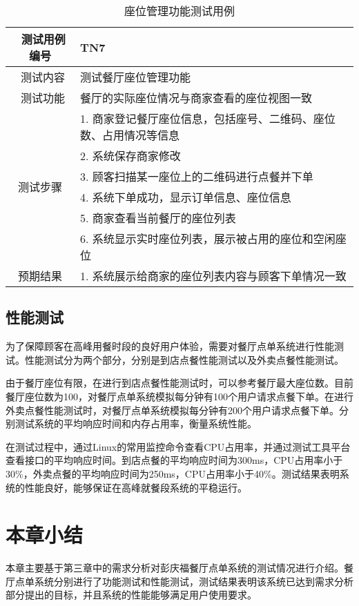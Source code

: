 \begin{table}[htbp!]
    \footnotesize
    \centering
    \caption{座位管理功能测试用例}
    \vspace{2mm}
    \begin{tabular}{cp{11.5cm}}
     \hline
     \ 测试用例编号 & TN7 \\ 
     \hline
     \ 测试内容 & 测试餐厅座位管理功能\\ 
     \hline
     \ 测试功能 & 餐厅的实际座位情况与商家查看的座位视图一致 \\ 
     \hline
     \multirow{6}{*}{测试步骤}
      & 1. 商家登记餐厅座位信息，包括座号、二维码、座位数、占用情况等信息\\
      & 2. 系统保存商家修改\\
      & 3. 顾客扫描某一座位上的二维码进行点餐并下单\\
      & 4. 系统下单成功，显示订单信息、座位信息\\
      & 5. 商家查看当前餐厅的座位列表\\
      & 6. 系统显示实时座位列表，展示被占用的座位和空闲座位\\
      \hline
     \multirow{1}{*}{预期结果}
      & 1. 系统展示给商家的座位列表内容与顾客下单情况一致\\
    \hline
    \end{tabular}   
    \label{table:tn7}
\end{table}

\subsection{性能测试}
为了保障顾客在高峰用餐时段的良好用户体验，需要对餐厅点单系统进行性能测试。性能测试分为两个部分，分别是到店点餐性能测试以及外卖点餐性能测试。

由于餐厅座位有限，在进行到店点餐性能测试时，可以参考餐厅最大座位数。目前餐厅座位数为100，对餐厅点单系统模拟每分钟有100个用户请求点餐下单。在进行外卖点餐性能测试时，对餐厅点单系统模拟每分钟有200个用户请求点餐下单。分别测试系统的平均响应时间和内存占用率，衡量系统性能。

在测试过程中，通过Linux的常用监控命令查看CPU占用率，并通过测试工具平台查看接口的平均响应时间。到店点餐的平均响应时间为300ms，CPU占用率小于30\%，外卖点餐的平均响应时间为250ms，CPU占用率小于40\%。测试结果表明系统的性能良好，能够保证在高峰就餐段系统的平稳运行。

\section{本章小结}
本章主要基于第三章中的需求分析对彭庆福餐厅点单系统的测试情况进行介绍。餐厅点单系统分别进行了功能测试和性能测试，测试结果表明该系统已达到需求分析部分提出的目标，并且系统的性能能够满足用户使用要求。